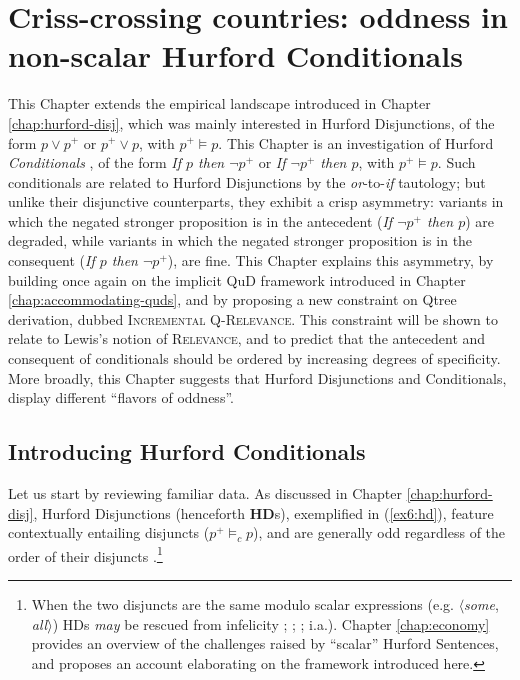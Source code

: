 \chapter[Criss-crossing countries: oddness in non-scalar Hurford Conditionals]{Criss-crossing countries: oddness in non-scalar Hurford Conditionals\footnotemark}\label{chap:hurford-sentences}

This Chapter extends the empirical landscape introduced in Chapter \ref{chap:hurford-disj}, which was mainly interested in Hurford Disjunctions, of the form $p \vee p^+$ or $p^+ \vee p$, with $p^+ \vDash p$. This Chapter is an investigation of Hurford \textit{Conditionals} \citep{Mandelkern2018,Kalomoiros2024}, of the form \textit{If $p$ then $\neg p^+$} or \textit{If $\neg p^+$ then $p$}, with $p^+ \vDash p$. Such conditionals are related to Hurford Disjunctions by the \textit{or}-to-\textit{if} tautology; but unlike their disjunctive counterparts, they exhibit a crisp asymmetry: variants in which the negated stronger proposition is in the antecedent (\textit{If $\neg p^+$ then $p$}) are degraded, while variants in which the negated stronger proposition is in the consequent (\textit{If $p$ then $\neg p^+$}), are fine. This Chapter explains this asymmetry, by building once again on the implicit QuD framework introduced in Chapter \ref{chap:accommodating-quds}, and by proposing a new constraint on Qtree derivation, dubbed \textsc{Incremental Q-Relevance}. This constraint will be shown to relate to Lewis's notion of \textsc{Relevance}, and to predict that the antecedent and consequent of conditionals should be ordered by increasing degrees of specificity. More broadly, this Chapter suggests that Hurford Disjunctions and Conditionals, display different ``flavors of oddness''.




\section{Introducing Hurford Conditionals}

Let us start by reviewing familiar data. As discussed in Chapter \ref{chap:hurford-disj}, Hurford Disjunctions (henceforth \textbf{HD}s), exemplified in (\ref{ex6:hd}), feature contextually entailing disjuncts ($p^+ \vDash_c p$), and are generally odd regardless of the order of their disjuncts \citep{Hurford1974}.\footnote{When the two disjuncts are the same modulo scalar expressions (e.g. $\langle$\textit{some}, \textit{all}$\rangle$) HDs \textit{may} be rescued from infelicity ; ; ;  i.a.). Chapter \ref{chap:economy} provides an overview of the challenges raised by ``scalar'' Hurford Sentences, and proposes an account elaborating on the framework introduced here.}


